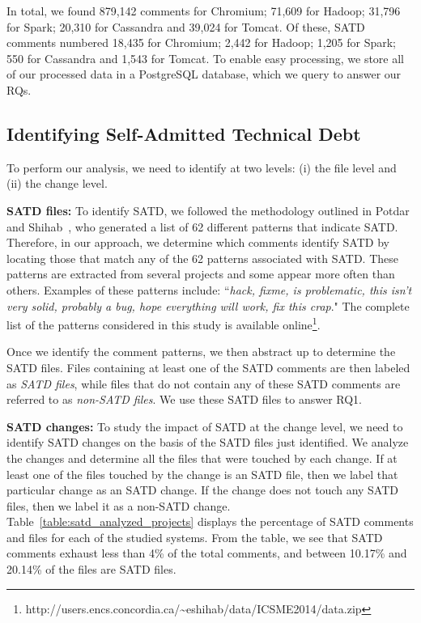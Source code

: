 In total, we found 879,142 comments for Chromium; 71,609 for Hadoop; 31,796 for Spark; 20,310 for Cassandra and 39,024 for Tomcat. Of these, SATD comments numbered 18,435 for Chromium; 2,442 for Hadoop; 1,205 for Spark; 550 for Cassandra and 1,543 for Tomcat. To enable easy processing, we store all of our processed data in a PostgreSQL database, which we query to answer our RQs.


\subsection{Identifying Self-Admitted Technical Debt}
\label{ch3_td}
To perform our analysis, we need to identify \SATD at two levels: (i) the file level and (ii) the change level.



\noindent\textbf{SATD files:} To identify SATD, we followed the methodology outlined in Potdar and Shihab~\cite{ICSM_PotdarS14}, who generated a list of 62 different patterns that indicate SATD. Therefore, in our approach, we determine which comments identify SATD by locating those that match any of the 62 patterns associated with SATD. These patterns are extracted from several projects and some appear more often than others. Examples of these patterns include: ``\textit{hack, fixme, is problematic, this isn't very solid, probably a bug, hope everything will work, fix this crap}." The complete list of the patterns considered in this study is available online\footnote{http://users.encs.concordia.ca/\textasciitilde eshihab/data/ICSME2014/data.zip}.

Once we identify the comment patterns, we then abstract up to determine the SATD files. Files containing at least one of the SATD comments are then labeled as {\em SATD files}, while files that do not contain any of these SATD comments are referred to as {\em non-SATD files}. We use these SATD files to answer RQ1.

\noindent\textbf{SATD changes:}
To study the impact of SATD at the change level, we need to identify SATD changes on the basis of the SATD files just identified. We analyze the changes and determine all the files that were touched by each change. If at least one of the files touched by the change is an SATD file, then we label that particular change as an SATD change. If the change does not touch any SATD files, then we label it as a non-SATD change. Table~\ref{table:satd_analyzed_projects} displays the percentage of SATD comments and files for each of the studied systems. From the table, we see that SATD comments exhaust less than 4\% of the total comments, and between 10.17\% and 20.14\% of the files are SATD files.

